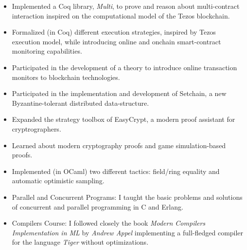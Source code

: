     \begin{itemize}
        \item Implemented a Coq library,
            \emph{Multi}, to prove and reason about multi-contract
            interaction inspired on the computational model of the Tezos blockchain.
        \item Formalized (in Coq) different execution strategies, inspired by
            Tezos execution model, while introducing online and onchain smart-contract
            monitoring capabilities.
        \item Participated in the development of a theory to introduce
            online transaction monitors to blockchain
            technologies.
        \item Participated in the implementation and development of
            Setchain, a new Byzantine-tolerant distributed
            data-structure.
    \end{itemize}
    \divider

    \begin{itemize}
        \item Expanded the strategy toolbox of
            EasyCrypt, a modern proof assistant for cryptrographers.
        \item Learned about modern cryptography proofs and game simulation-based proofs.
        \item Implemented (in OCaml) two different tactics: field/ring equality
            and automatic optimistic sampling.
    \end{itemize}

\newpage


    \begin{itemize}
        \item Parallel and Concurrent Programs: I taught the basic
            problems and solutions of concurrent and parallel programming in C and Erlang.
        \item Compilers Course: I followed closely the book \emph{Modern
                Compilers Implementation in ML} by \emph{Andrew Appel}
            implementing a full-fledged compiler for the language
            \emph{Tiger} without optimizations.
    \end{itemize}
    \divider

